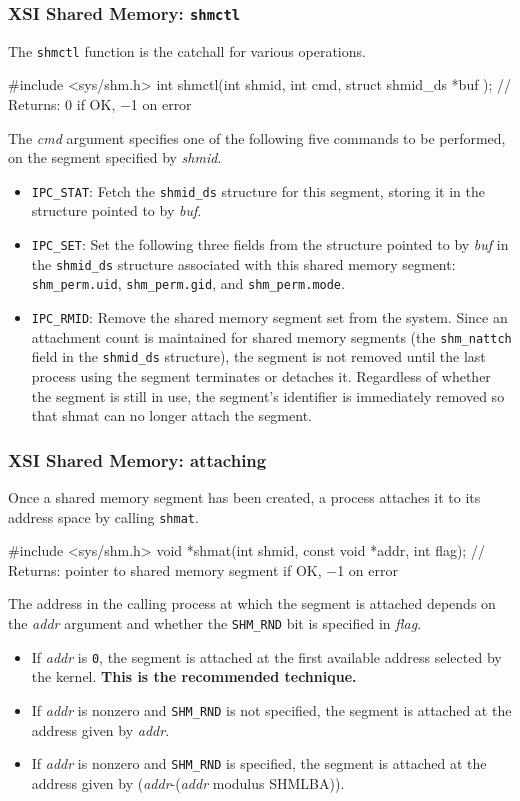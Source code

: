 \documentclass[newPxFont,sthlmFooter,nooffset]{beamer}
\begin{document}
\begin{frame}[t, fragile]
  \frametitle{XSI Shared Memory: \texttt{shmctl}}
The \texttt{shmctl} function is the catchall for various  operations.
\begin{codedef}
#include <sys/shm.h>
int shmctl(int shmid, int cmd, struct shmid_ds *buf );
// Returns: 0 if OK, −1 on error
\end{codedef}
The \textit{cmd} argument specifies one of the following five commands to be performed, on the segment specified by \textit{shmid}.
{\footnotesize
\begin{itemize}
\item \texttt{IPC\_STAT}: Fetch the \texttt{shmid\_ds} structure for this segment, storing it in the structure pointed to by \textit{buf}.
\item \texttt{IPC\_SET}: Set the following three fields from the structure pointed to by \textit{buf} in the \texttt{shmid\_ds} structure associated with this shared memory segment: \texttt{shm\_perm.uid}, \texttt{shm\_perm.gid}, and \texttt{shm\_perm.mode}. 
\item \texttt{IPC\_RMID}: Remove the shared memory segment set from the system. Since an attachment count is maintained for shared memory segments (the \texttt{shm\_nattch} field in the \texttt{shmid\_ds} structure), the segment is not removed until the last process using the segment terminates or detaches it. Regardless of whether the segment is still in use, the segment’s identifier is immediately removed so that shmat can no longer attach the segment. 
\end{itemize}
}
\end{frame}



\begin{frame}[t, fragile]
  \frametitle{XSI Shared Memory: attaching}
Once a shared memory segment has been created, a process attaches it to its address space by calling \texttt{shmat}.
\begin{codedef}
#include <sys/shm.h>
void *shmat(int shmid, const void *addr, int flag);
// Returns: pointer to shared memory segment if OK, −1 on error
\end{codedef}
The address in the calling process at which the segment is attached depends on the \textit{addr} argument and whether the \texttt{SHM\_RND} bit is specified in \textit{flag}.
{\footnotesize
\begin{itemize}
\item  If \textit{addr} is \texttt{0}, the segment is attached at the first available address selected by the kernel. \textbf{This is the recommended technique.}
\item If \textit{addr} is nonzero and \texttt{SHM\_RND} is not specified, the segment is attached at the address given by \textit{addr}.
\item If \textit{addr} is nonzero and \texttt{SHM\_RND} is specified, the segment is attached at the address given by (\textit{addr}-(\textit{addr} modulus SHMLBA)). 

\end{itemize}
}
\end{frame}
\end{document}
